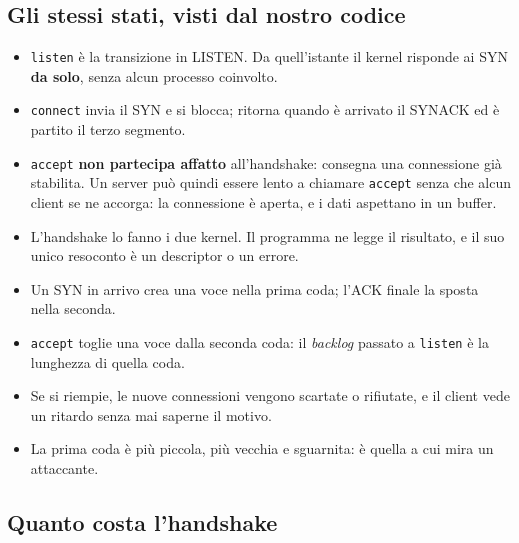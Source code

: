 \subsection{Gli stessi stati, visti dal nostro codice}

\begin{itemize}
    \item \texttt{listen} è la transizione in LISTEN. Da quell'istante il kernel risponde ai SYN \textbf{da solo}, senza
          alcun processo coinvolto.
    \item \texttt{connect} invia il SYN e si blocca; ritorna quando è arrivato il SYNACK ed è partito il terzo segmento.
    \item \texttt{accept} \textbf{non partecipa affatto} all'handshake: consegna una connessione già stabilita. Un server può
          quindi essere lento a chiamare \texttt{accept} senza che alcun client se ne accorga: la connessione è aperta, e i
          dati aspettano in un buffer.
    \item L'handshake lo fanno i due kernel. Il programma ne legge il risultato, e il suo unico resoconto è un descriptor o
          un errore.
\end{itemize}


\begin{itemize}
    \item Un SYN in arrivo crea una voce nella prima coda; l'ACK finale la sposta nella seconda.
    \item \texttt{accept} toglie una voce dalla seconda coda: il \emph{backlog} passato a \texttt{listen} è la lunghezza di
          quella coda.
    \item Se si riempie, le nuove connessioni vengono scartate o rifiutate, e il client vede un ritardo senza mai saperne il
          motivo.
    \item La prima coda è più piccola, più vecchia e sguarnita: è quella a cui mira un attaccante.
\end{itemize}

\subsection{Quanto costa l'handshake}

